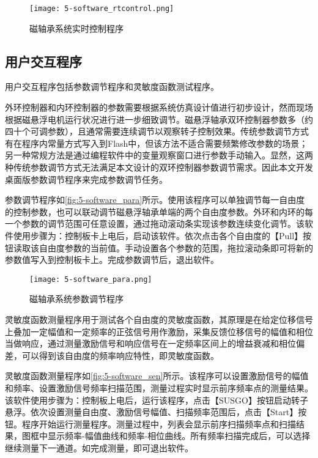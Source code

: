 \documentclass[
  lang=cn,
  degree=master,
  openany,oneside
]{nuaathesis}
\begin{document}
\begin{figure}[h!]
	\texttt{[image: 5-software\_rtcontrol.png]}
	\caption{磁轴承系统实时控制程序}
	\label{fig:5-software_rtcontrol}
\end{figure}

\subsection{用户交互程序}
用户交互程序包括参数调节程序和灵敏度函数测试程序。

外环控制器和内环控制器的参数需要根据系统仿真设计值进行初步设计，然而现场根据磁悬浮电机运行状况进行进一步细致调节。磁悬浮轴承双环控制器参数多（约四十个可调参数），且通常需要连续调节以观察转子控制效果。传统参数调节方式有在程序内常量方式写入到Flash中，但该方法不适合需要频繁修改参数的场景；另一种常规方法是通过编程软件中的变量观察窗口进行参数手动输入。显然，这两种传统参数调节方式无法满足本文设计的双环控制器参数调节需求。因此本文开发桌面版参数调节程序来完成参数调节任务。

参数调节程序如\autoref{fig:5-software_para}所示。使用该程序可以单独调节每一自由度的控制参数，也可以联动调节磁悬浮轴承单端的两个自由度参数。外环和内环的每一个参数的调节范围可任意设置，通过拖动滚动条实现该参数连续变化调节。该软件使用步骤为：控制板卡上电后，启动该软件。依次点击各个自由度的【Pull】按钮读取该自由度参数的当前值。手动设置各个参数的范围，拖拉滚动条即可将新的参数值写入到控制板卡上。完成参数调节后，退出软件。

\begin{figure}[h!]
	\texttt{[image: 5-software\_para.png]}
	\caption{磁轴承系统参数调节程序}
	\label{fig:5-software_para}
\end{figure}

灵敏度函数测量程序用于测试各个自由度的灵敏度函数，其原理是在给定位移信号上叠加一定幅值和一定频率的正弦信号用作激励，采集反馈位移信号的幅值和相位当做响应，通过测量激励信号和响应信号在一定频率区间上的增益衰减和相位偏差，可以得到该自由度的频率响应特性，即灵敏度函数。

灵敏度函数测量程序如\autoref{fig:5-software_sen}所示。该程序可以设置激励信号的幅值和频率、设置激励信号频率扫描范围，测量过程实时显示前序频率点的测量结果。该软件使用步骤为：控制板上电后，运行该程序，点击【SUSGO】按钮启动转子悬浮。依次设置测量自由度、激励信号幅值、扫描频率范围后，点击【Start】按钮。程序开始运行测量程序。测量过程中，列表会显示前序扫描频率点和扫描结果，图框中显示频率-幅值曲线和频率-相位曲线。所有频率扫描完成后，可以选择继续测量下一通道。如完成测量，即可退出软件。
\end{document}
